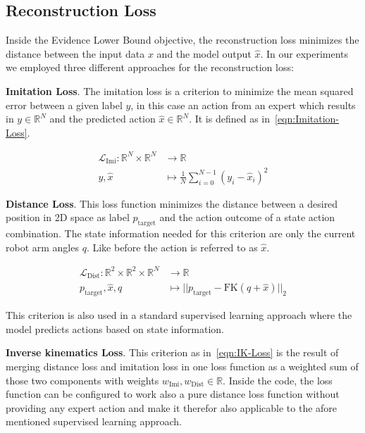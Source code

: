 \subsection{Reconstruction Loss}

Inside the Evidence Lower Bound objective, the reconstruction loss minimizes the distance between the input data $x$ and the model output $\hat{x}$. In our experiments we employed three different approaches for the reconstruction loss:

\textbf{Imitation Loss}. The imitation loss is a criterion to minimize the mean squared error between a given label $y$, in this case an action from an expert which results in $y \in \mathbb{R}^N$ and the predicted action $\hat{x} \in \mathbb{R}^N$. It is defined as in~\eqref{eqn:Imitation-Loss}.

\begin{equation}\label{eqn:Imitation-Loss}
    \begin{split}
        \mathcal{L}_\text{Imi}: \mathbb{R}^N \times \mathbb{R}^N & \to \mathbb{R} \\
        y, \hat{x} & \mapsto \frac{1}{N}\sum_{i = 0}^{N-1} \left(y_i - \hat{x}_i\right)^2 
    \end{split}
\end{equation}

\textbf{Distance Loss}. This loss function minimizes the distance between a desired position in 2D space as label $p_\text{target}$ and the action outcome of a state action combination. The state information needed for this criterion are only the current robot arm angles $q$. Like before the action is referred to as $\hat{x}$.

\begin{equation}\label{eqn:Distance-Loss}
    \begin{split}
        \mathcal{L}_\text{Dist}: \mathbb{R}^2 \times \mathbb{R}^2 \times \mathbb{R}^N & \to \mathbb{R} \\
        p_\text{target}, \hat{x}, q & \mapsto ||p_\text{target} - \text{FK}(q + \hat{x})||_2
    \end{split}
\end{equation}

This criterion is also used in a standard supervised learning approach where the model predicts actions based on state information.

\textbf{Inverse kinematics Loss}. This criterion as in~\eqref{eqn:IK-Loss} is the result of merging distance loss and imitation loss in one loss function as a weighted sum of those two components with weights $w_\text{Imi}, w_\text{Dist} \in \mathbb{R}$. Inside the code, the loss function can be configured to work also a pure distance loss function without providing any expert action and make it therefor also applicable to the afore mentioned supervised learning approach. 

